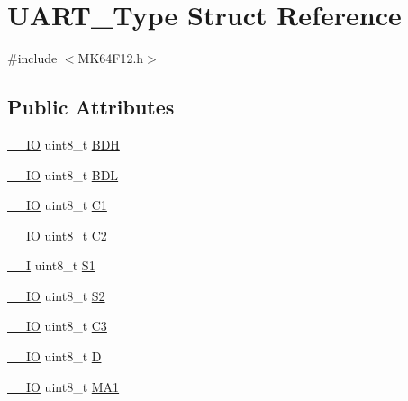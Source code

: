 \hypertarget{structUART__Type}{}\section{U\+A\+R\+T\+\_\+\+Type Struct Reference}
\label{structUART__Type}


{\ttfamily \#include $<$M\+K64\+F12.\+h$>$}

\subsection*{Public Attributes}
\begin{DoxyCompactItemize}
\item 
\hyperlink{core__sc300_8h_aec43007d9998a0a0e01faede4133d6be}{\+\_\+\+\_\+\+IO} uint8\+\_\+t \hyperlink{structUART__Type_a64b68e0c2e2c00962c1f6ff05768a247}{B\+DH}
\item 
\hyperlink{core__sc300_8h_aec43007d9998a0a0e01faede4133d6be}{\+\_\+\+\_\+\+IO} uint8\+\_\+t \hyperlink{structUART__Type_a82d811085ff9f014e2412f0306ca99cc}{B\+DL}
\item 
\hyperlink{core__sc300_8h_aec43007d9998a0a0e01faede4133d6be}{\+\_\+\+\_\+\+IO} uint8\+\_\+t \hyperlink{structUART__Type_a7d2060193a370f0e9a31ccbcc18324af}{C1}
\item 
\hyperlink{core__sc300_8h_aec43007d9998a0a0e01faede4133d6be}{\+\_\+\+\_\+\+IO} uint8\+\_\+t \hyperlink{structUART__Type_a4050bfe335adcde0e5b87823ea26bc28}{C2}
\item 
\hyperlink{core__sc300_8h_af63697ed9952cc71e1225efe205f6cd3}{\+\_\+\+\_\+I} uint8\+\_\+t \hyperlink{structUART__Type_ab085fb9bbfccce5ace6b752d9784ee26}{S1}
\item 
\hyperlink{core__sc300_8h_aec43007d9998a0a0e01faede4133d6be}{\+\_\+\+\_\+\+IO} uint8\+\_\+t \hyperlink{structUART__Type_ad9178df20b457eace88576a7cb26d75d}{S2}
\item 
\hyperlink{core__sc300_8h_aec43007d9998a0a0e01faede4133d6be}{\+\_\+\+\_\+\+IO} uint8\+\_\+t \hyperlink{structUART__Type_a23270f53f190afb3fe05203af6bc0059}{C3}
\item 
\hyperlink{core__sc300_8h_aec43007d9998a0a0e01faede4133d6be}{\+\_\+\+\_\+\+IO} uint8\+\_\+t \hyperlink{structUART__Type_af5e2df4671867807c472469a394c0619}{D}
\item 
\hyperlink{core__sc300_8h_aec43007d9998a0a0e01faede4133d6be}{\+\_\+\+\_\+\+IO} uint8\+\_\+t \hyperlink{structUART__Type_a73acabe00975b26ce347736f07c80925}{M\+A1}
\item 

\end{DoxyCompactItemize}
